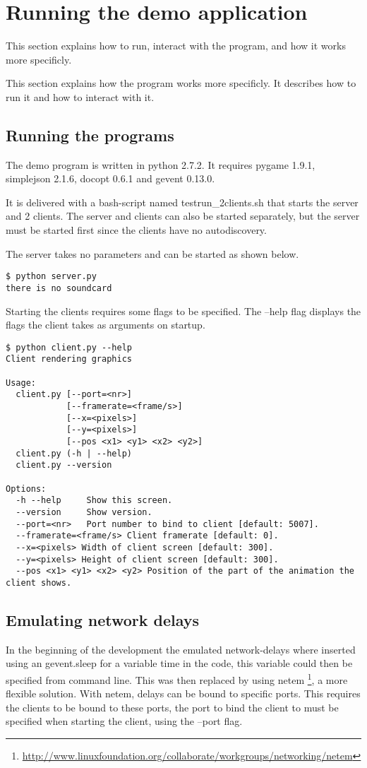 \chapter{Running the demo application}

This section explains how to run, interact with the program, and how it works more specificly.

This section explains how the program works more specificly. It describes how to run it and how to interact with it. 

\section{Running the programs}
The demo program is written in python 2.7.2. It requires pygame 1.9.1, simplejson 2.1.6, docopt 0.6.1 and gevent 0.13.0. 

It is delivered with a bash-script named testrun\_2clients.sh that starts the server and 2 clients. The server and clients can also be started separately, but the server must be started first since the clients have no autodiscovery. 

The server takes no parameters and can be started as shown below. 

\begin{verbatim}
$ python server.py
there is no soundcard
\end{verbatim}

Starting the clients requires some flags to be specified. The --help flag displays the flags the client takes as arguments on startup. 

\begin{verbatim}
$ python client.py --help
Client rendering graphics

Usage:
  client.py [--port=<nr>]
            [--framerate=<frame/s>]
            [--x=<pixels>]
            [--y=<pixels>]
            [--pos <x1> <y1> <x2> <y2>]
  client.py (-h | --help)
  client.py --version

Options:
  -h --help     Show this screen.
  --version     Show version.
  --port=<nr>   Port number to bind to client [default: 5007].
  --framerate=<frame/s> Client framerate [default: 0].
  --x=<pixels> Width of client screen [default: 300].
  --y=<pixels> Height of client screen [default: 300].
  --pos <x1> <y1> <x2> <y2> Position of the part of the animation the client shows.
\end{verbatim}



\section{Emulating network delays}
In the beginning of the development the emulated network-delays where inserted using an gevent.sleep for a variable time in the code, this variable could then be specified from command line. This was then replaced by using netem \footnote{\url{http://www.linuxfoundation.org/collaborate/workgroups/networking/netem}}, a more flexible solution. With netem, delays can be bound to specific ports. This requires the clients to be bound to these ports, the port to bind the client to must be specified when starting the client, using the --port flag. 

